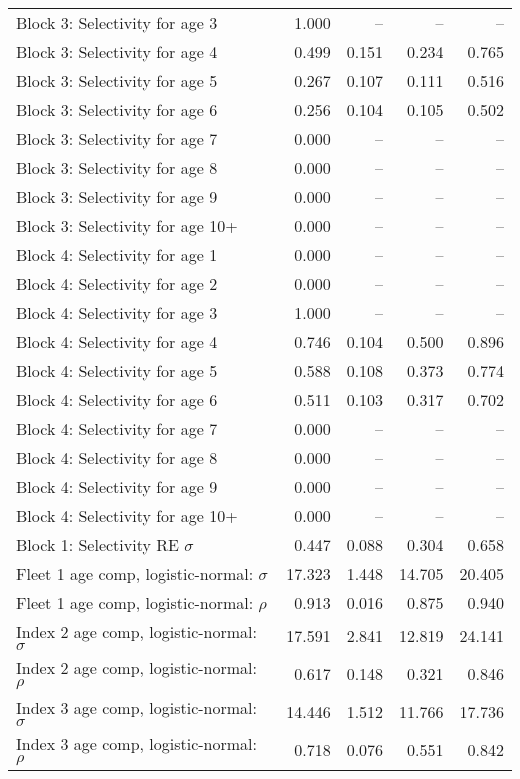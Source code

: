 \documentclass[
]{article}
\begin{document}
\begin{landscape}
\begin{longtable}[t]{lrrrr}
\addlinespace
Block 3: Selectivity for age 3 & 1.000 & -- & -- & --\\
Block 3: Selectivity for age 4 & 0.499 & 0.151 & 0.234 & 0.765\\
Block 3: Selectivity for age 5 & 0.267 & 0.107 & 0.111 & 0.516\\
Block 3: Selectivity for age 6 & 0.256 & 0.104 & 0.105 & 0.502\\
Block 3: Selectivity for age 7 & 0.000 & -- & -- & --\\
\addlinespace
Block 3: Selectivity for age 8 & 0.000 & -- & -- & --\\
Block 3: Selectivity for age 9 & 0.000 & -- & -- & --\\
Block 3: Selectivity for age 10+ & 0.000 & -- & -- & --\\
Block 4: Selectivity for age 1 & 0.000 & -- & -- & --\\
Block 4: Selectivity for age 2 & 0.000 & -- & -- & --\\
\addlinespace
Block 4: Selectivity for age 3 & 1.000 & -- & -- & --\\
Block 4: Selectivity for age 4 & 0.746 & 0.104 & 0.500 & 0.896\\
Block 4: Selectivity for age 5 & 0.588 & 0.108 & 0.373 & 0.774\\
Block 4: Selectivity for age 6 & 0.511 & 0.103 & 0.317 & 0.702\\
Block 4: Selectivity for age 7 & 0.000 & -- & -- & --\\
\addlinespace
Block 4: Selectivity for age 8 & 0.000 & -- & -- & --\\
Block 4: Selectivity for age 9 & 0.000 & -- & -- & --\\
Block 4: Selectivity for age 10+ & 0.000 & -- & -- & --\\
Block 1: Selectivity RE $\sigma$ & 0.447 & 0.088 & 0.304 & 0.658\\
Fleet 1 age comp, logistic-normal: $\sigma$ & 17.323 & 1.448 & 14.705 & 20.405\\
\addlinespace
Fleet 1 age comp, logistic-normal: $\rho$ & 0.913 & 0.016 & 0.875 & 0.940\\
Index 2 age comp, logistic-normal: $\sigma$ & 17.591 & 2.841 & 12.819 & 24.141\\
Index 2 age comp, logistic-normal: $\rho$ & 0.617 & 0.148 & 0.321 & 0.846\\
Index 3 age comp, logistic-normal: $\sigma$ & 14.446 & 1.512 & 11.766 & 17.736\\
Index 3 age comp, logistic-normal: $\rho$ & 0.718 & 0.076 & 0.551 & 0.842\\*
\end{longtable}
\end{landscape}
\end{document}

